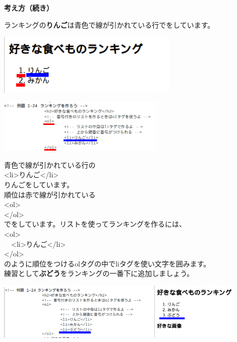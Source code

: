 \clearpage


\flushleft
\textbf{考え方（続き）}


\bigskip


ランキングの\textbf{りんご}は青色で線が引かれている行でをしています。


\bigskip


\includegraphics[width=0.65\textwidth]{text01-img/textbook-img182.png}


\bigskip


\includegraphics[width=0.6\textwidth]{text01-img/textbook-img181.png}


青色で線が引かれている行の\\
{\textless}li{\textgreater}りんご{\textless}/li{\textgreater}\\
りんごをしています。\\
順位は赤で線が引かれている\\
{\textless}ol{\textgreater}\\
{\textless}/ol{\textgreater}\\
でをしています。リストを使ってランキングを作るには、\\
{\textless}ol{\textgreater}\\
\ \ {\textless}li{\textgreater}りんご{\textless}/li{\textgreater}\\
{\textless}/ol{\textgreater}\\
のように順位をつけるolタグの中でliタグを使い文字を囲みます。\\
練習として\textbf{ぶどう}をランキングの一番下に追加しましょう。\\


\bigskip


\includegraphics[width=0.9\textwidth]{text01-img/textbook-img183.png}


